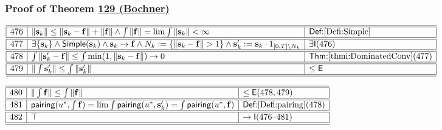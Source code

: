 \documentclass[11pt,reqno]{amsart}
\begin{document}
\medskip

\subsubsection*{Proof of Theorem \hyperlink{thm:Bochner}{129 (\textsf{Bochner})}}

\noindent$%
\begin{array}{|r|l|l|}
\hline\hline
476 & \|\mathbf{s}_{k}\|\le\|\mathbf{s}_{k}-\mathbf{f}\|+\|\mathbf{f}\|\wedge\int\|\mathbf{f}\|=\lim\int\|\mathbf{s}_{k}\|<\infty & \textsf{Def:}\ref{Defi:Simple} \\ \hline\hline
477 & \exists\{\mathbf{s}_{k}\}\wedge\mathsf{Simple}(\mathbf{s}_{k})\wedge\mathbf{s}_{k}\to\mathbf{f}\wedge N_{k}:=\{\|\mathbf{s}_{k}-\mathbf{f}\|>1\}\wedge\mathbf{s}_{k}^{\prime}:=\mathbf{s}_{k}\cdot1_{[0,T]\setminus N_{k}} & \exists\mathsf{I}(476) \\ \hline\hline
478 & \int\|\mathbf{s}_{k}^{\prime}-\mathbf{f}\|\le\int\min(1,\|\mathbf{s}_{k}-\mathbf{f}\|)\to0 & \textsf{Thm:}\ref{thmi:DominatedConv}(477) \\ \hline\hline
479 & \|\int\mathbf{s}_{k}^{\prime}\|\le\int\|\mathbf{s}_{k}^{\prime}\| & \le\mathsf{E} \\ \hline\hline
\end{array}%
$

\medskip

\noindent$%
\begin{array}{|r|l|l|}
\hline\hline
480 & \|\int\mathbf{f}\|\le\int\|\mathbf{f}\| & \le\mathsf{E}(478,479) \\ \hline\hline
481 & \mathsf{pairing}(u^{*},\int\mathbf{f})=\lim\int\mathsf{pairing}(u^{*},\mathbf{s}_{k}^{\prime})=\int\mathsf{pairing}(u^{*},\mathbf{f}) & \textsf{Def:}\ref{Defi:pairing}(478) \\ \hline\hline
482 & \top & \to\mathsf{I}(476\text{--}481) \\ \hline\hline
\end{array}%
$
\end{document}
